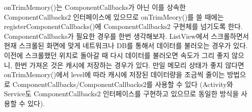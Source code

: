 onTrimMemory()는 ComponentCallbacks가 아닌 이를 상속한 ComponentCallbacks2 인터페이스에 있으므로 onTrimMeory()를 쓸 때에는 registerComponentCallbacks()에 ComponentCallbacks2 구현체를 넘기도록 한다.\\

ComponentCallbacks가 필요한 경우를 한번 생각해보자.
ListView에서 스크롤하면서 현재 스크롤된 화면에 맞게 네트워크나 DB를 통해서 데이터를 불러오는 경우가 있다. 이전에 스크롤했던 위치로 돌아갈 때 다시 데이터를 불러오면 속도가 그리 좋지 않으니, 한번 가져온 것은 캐시에 저장하는 경우가 있다.
만일 메모리 상태가 좋지 않다면 onTrimMemory()에서 level에 따라 캐시에 저장된 데이터량을 조금씩 줄이는 방법으로 ComponentCallbacks/ComponentCallbacks2를 사용할 수 있다
(Activity와 Service도 ComponentCallbacks2 인터페이스를 구현하고 있으므로 동일한 방식을 사용할 수 있다).\\

